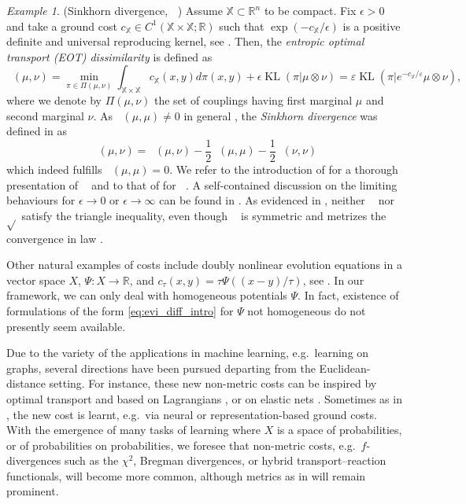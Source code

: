 \documentclass[reqno]{amsart}
\newcounter{results}[section]
\theoremstyle{plain}
\theoremstyle{remark}
\newtheorem{example}[results]{Example}
\theoremstyle{plain}
\numberwithin{equation}{section}
\theoremstyle{remark}
\newcommand{\R}{\mathbb{R}}
\newcommand{\X}{\mathbb{X}}
\newcommand{\eps}{\varepsilon}
\DeclareMathOperator{\OT}{OT}
\DeclareMathOperator{\KL}{KL}
\DeclareMathOperator{\Seps}{S_\epsilon}
\DeclareMathOperator{\OTeps}{\OT_\epsilon}
\begin{document}
\begin{example}(Sinkhorn divergence, $\Seps$)
	\label{ex:Sinkhorn} Assume $\X\subset \R^n$ to be compact. Fix $\epsilon>0$ and take a ground cost $c_\X\in C^1(\X\times\X;\R)$ such that $\exp(-c_\X/\epsilon)$ is a positive definite and universal reproducing kernel, see \cite{feydy2019interpolating}. Then, the {\it entropic optimal transport (EOT) dissimilarity} is defined as
	\begin{equation}\label{eq:oteps}
		\OTeps(\mu,\nu)=\min_{\pi \in \Pi(\mu,\nu)} 
		\int_{\X\times\X} c_\X(x,y) d\pi(x,y)+\epsilon\KL(\pi|\mu\otimes \nu)=\eps\KL(\pi|e^{-c_\X/\eps}\mu\otimes\nu),
	\end{equation}
	where we denote by $\Pi(\mu,\nu)$ the set of couplings having first marginal $\mu$ and second marginal $\nu$.  As $\OTeps(\mu,\mu)\not =0$ in general \cite[Section 1.2]{feydy2019interpolating}, the {\it Sinkhorn divergence} was defined in \cite{genevay2018learning} as  
	\begin{equation}\label{eq:s_eps}
		\Seps(\mu,\nu)=\OTeps(\mu,\nu)-\frac12\OTeps(\mu,\mu)-\frac12\OTeps(\nu,\nu)
	\end{equation}
     which indeed fulfills $\Seps(\mu,\mu)=0$. 
	We refer to the introduction of \cite{Carlier2017}  for a thorough presentation  of $\OTeps$ and to that of \cite[p.~5]{lavenant2024riemannian} for $\Seps$. A self-contained discussion on the limiting behaviours for $\epsilon\to 0$ or $\epsilon\to \infty$ can be found in \cite{Neumayer2021}. As evidenced in \cite[Section 7.1]{lavenant2024riemannian},  neither  $\Seps$ nor $\sqrt{\Seps}$  satisfy the triangle inequality, even though $\Seps$ is symmetric and metrizes the convergence in law  \cite[Theorem 1]{feydy2019interpolating}.
\end{example}
Other natural examples of costs include doubly nonlinear evolution equations  in a vector space  $X$, $\Psi:X\to \R$, and $c_\tau(x,y)=\tau\Psi((x-y)/{\tau})$,  see   \cite{Rossi2009}.  In our framework, we can only deal with  
 homogeneous   potentials  $\Psi$.  In fact, existence of formulations of the form \eqref{eq:evi_diff_intro} for $\Psi$ not homogeneous do not presently seem available.    

Due to the variety of the applications in machine learning, e.g.\ learning on graphs, several directions have been pursued  departing  from the Euclidean-distance  setting.  For instance, these new non-metric costs can be inspired by optimal transport and based on Lagrangians \cite{pooladian2024neural}, or on elastic nets \cite{klein2024learning}. Sometimes  as in \cite{auffenberg2025unsupervised}, the new cost is learnt, e.g.\ via neural or representation-based ground costs. With the emergence of many tasks of learning where $X$ is a space of probabilities, or of probabilities on probabilities, we  foresee  that  non-metric costs, e.g.\ $f$-divergences such as the $\chi^2$, Bregman divergences, or hybrid transport–reaction functionals,  will   become more common, although metrics as in \cite{cuturi2014ground} will remain prominent.
\end{document}
